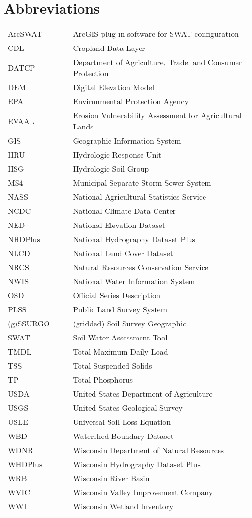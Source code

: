 \section*{Abbreviations}

\begin{tabular}{l c c l}

ArcSWAT &   & & ArcGIS plug-in software for SWAT configuration \\
CDL		&	& &	Cropland Data Layer				\\
DATCP	&	& & Department of Agriculture, Trade, and Consumer Protection \\
DEM		&	& &	Digital Elevation Model			\\
EPA		&	& &	Environmental Protection Agency	\\
EVAAL	&	& & Erosion Vulnerability Assessment for Agricultural Lands \\
GIS     &   & & Geographic Information System \\
HRU 	& 	& &	Hydrologic Response Unit 		\\
HSG		&	& &	Hydrologic Soil Group			\\
MS4		&	& &	Municipal Separate Storm Sewer System \\
NASS	&	& &	National Agricultural Statistics Service \\
NCDC	&	& &	National Climate Data Center \\
NED     &   & & National Elevation Dataset \\
NHDPlus &   & & National Hydrography Dataset Plus \\
NLCD	&	& &	National Land Cover Dataset	\\
NRCS	& 	& &	Natural Resources Conservation Service \\
NWIS	&	& &	National Water Information System \\
OSD		&	& &	Official Series Description \\
PLSS    &   & & Public Land Survey System \\
(g)SSURGO	& & &	(gridded) Soil Survey Geographic \\
SWAT 	& 	& &	Soil Water Assessment Tool 		\\
TMDL	&	& &	Total Maximum Daily Load		\\
TSS		&	& &	Total Suspended Solids		\\
TP		&	& & Total Phosphorus			\\
USDA	&	& &	United States Department of Agriculture\\
USGS 	&	& &	United States Geological Survey \\
USLE	&	& &	Universal Soil Loss Equation	\\
WBD		&	& &	Watershed Boundary Dataset		\\
WDNR	&	& &	Wisconsin Department of Natural Resources \\
WHDPlus	&	& &	Wisconsin Hydrography Dataset Plus \\
WRB		&	& &	Wisconsin River Basin			\\
WVIC	&	& &	Wisconsin Valley Improvement Company \\
WWI		&	& &	Wisconsin Wetland Inventory		\\
\end{tabular}

\clearpage